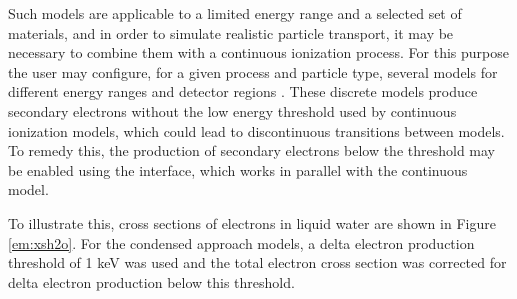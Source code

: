Such models are applicable to a limited energy range and a selected set of 
materials, and in order to simulate realistic particle transport, it may be 
necessary to combine them with a continuous ionization process.  For this 
purpose the user may configure, for a given process and particle type,
several models for different energy ranges and detector regions \cite{bib:uni}.
These discrete models produce secondary electrons without the low energy 
threshold used by continuous ionization models, which could lead to 
discontinuous transitions between models.  To remedy this, the production of 
secondary electrons below the threshold may be enabled using the 
 interface, which works in parallel with the 
continuous model.

To illustrate this, cross sections of electrons in liquid water are shown in
Figure \ref{em:xsh2o}.  For the condensed approach models, a delta electron 
production threshold of 1 keV was used and the total electron cross section was
corrected for delta electron production below this threshold.

